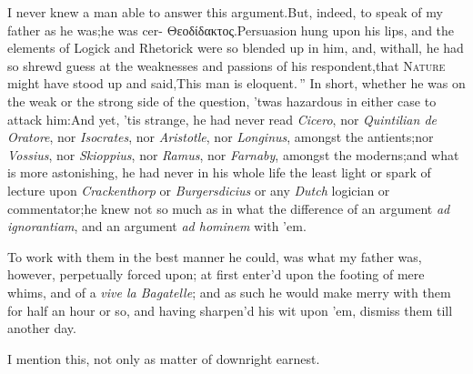 \documentclass[twoside]{article}
\begin{document}
I never knew a man able to answer this argument.\tsk But, indeed, to speak of
my father as he was;\tsk he was cer-
{\small Θεοδίδακτος}.\tsk Persuasion hung upon his lips, and the
elements of Logick and\break
Rhetorick were so blended up in him,\tsk\break
and, withall,
he had so shrewd guess at the weaknesses and passions of his
respondent,\tsh that \textsc{Nature} might have stood up and
said,\tsk \lqq This man is eloquent.\,” In short, whether he was
on the weak or the strong side of the que\-stion, ’twas hazardous in either
case to attack him:\tsk And yet, ’tis strange, he\break
had never read
\textit{Cicero}, nor \textit{Quintilian de Oratore}, nor \textit{Isocrates}, nor
\textit{Aristotle}, nor \textit{Longinus}, amongst the antients;\tsk nor
\textit{Vossius}, nor \textit{Skioppius}, nor \textit{Ramus},
nor\break
\textit{Farnaby}, amongst the moderns;\tsk and\break
what is more astonishing, he had never in\break
his whole life the least light or spark of\break
{}
lecture upon \textit{Crackenthorp} or \textit{Burgersdicius} or any
\textit{Dutch} logician or commentator;\tsk he knew not so much as in what the
difference of an argument \textit{ad igno\-rantiam}, and an argument \textit{ad
hominem}\break
{}
with ’em.

To work with them in the best manner he could, was what my
father was, however, perpetually forced upon;\tsh\break 
{}
at
first enter’d upon the footing of mere whims, and of a \textit{vive la
Bagatelle}; and as such he would make merry with them for half
an hour or so, and having sharpen’d his wit upon ’em, dismiss them
till another day.

I mention this, not only as matter of 
downright earnest.
\end{document}
